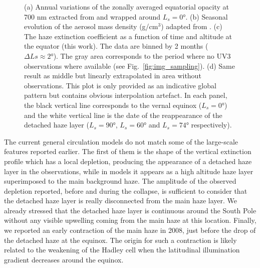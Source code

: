 \begin{figure*}[!ht]
\caption{(a) Annual variations of the zonally averaged equatorial opacity at 700 nm extracted from \cite{Lebonnois2012} and wrapped around $L_s = \ang{0}$.
(b) Seasonal evolution of the aerosol mass density (g/cm$^3$) adapted from \cite{Larson2015}.
(c) The haze extinction coefficient as a function of time and altitude at the equator (this work).
The data are binned by 2 months ($\Delta Ls \approx \ang{2} $). The gray area corresponds to the period where no UV3 observations where available (see Fig.~\ref{fig:img_sampling}).
(d) Same result as middle but linearly extrapolated in area without observations. This plot is only provided as an indicative global pattern but contains obvious interpolation artefact.
In each panel, the black vertical line corresponds to the vernal equinox ($L_s = \ang{0}$)
and the white vertical line is the date of the reappearance of the detached haze layer ($L_s = \ang{90}$, $L_s = \ang{60}$ and $L_s = \ang{74}$ respectively).}
\label{fig:gcm_cycle}
\end{figure*}

The current general circulation models do not match some of the large-scale features reported earlier. The first of them
is the shape of the vertical extinction profile which has a local depletion, producing the appearance of a detached haze layer in the
observations, while in models it appears as a high altitude haze layer superimposed to the main background haze.
The amplitude of the observed depletion reported, before and during the collapse, is sufficient to consider that the
detached haze layer is really disconnected from the main haze layer. We already stressed that the detached haze layer is
continuous around the South Pole without any visible upwelling coming from the main haze at this location. Finally, we
reported an early contraction of the main haze in 2008, just before the drop of the detached haze at the equinox. The origin
for such a contraction is likely related to the weakening of the Hadley cell when the latitudinal illumination gradient
decreases around the equinox.

